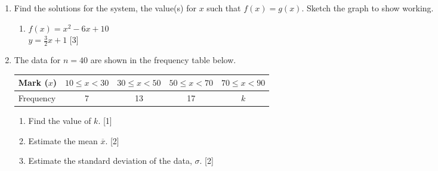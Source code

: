 \documentclass[12pt, twoside]{article}
\begin{document}
\begin{enumerate}
\newpage
    \item Find the solutions for the system, the value(s) for $x$ such that $f(x)=g(x)$. Sketch the graph to show working.
    \begin{enumerate}
        \item $f(x)=x^2-6x+10$ \\[0.25cm] $y=\frac{3}{2}x+1$ \hfill [3] \vspace{0.3cm}
    \end{enumerate}

\item The data for  $n=40$ are shown in the frequency table below.
    \begin{center}
        \begin{tabular}{|l|c|c|c|c|}
            \hline
            Mark ($x$) & $10 \leq x < 30$ & $30 \leq x < 50$ & $50 \leq x < 70$ & $70 \leq x < 90$\\ 
            \hline 
            Frequency & 7 & 13 & 17 & $k$\\ 
            \hline 
            \end{tabular}
    \end{center}
    \begin{enumerate}
        \item Find the value of $k$.  \hfill [1]
        \item Estimate the mean $\overline{x}$. \hfill [2]
        \item Estimate the standard deviation of the data, $\sigma$.  \hfill [2]
        \end{enumerate}
           
\end{enumerate}
\end{document}
